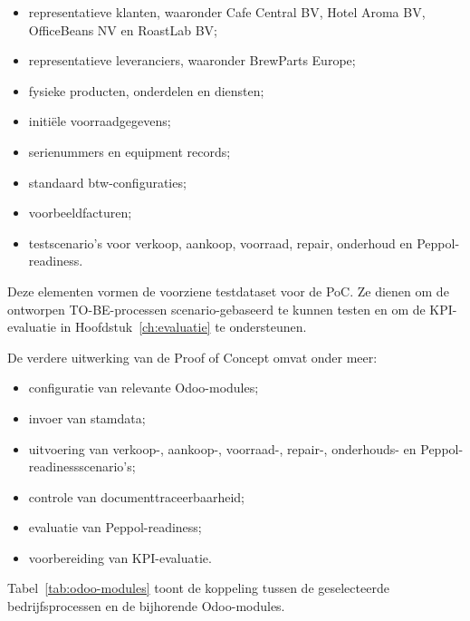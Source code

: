 \begin{itemize}
    \item representatieve klanten, waaronder Cafe Central BV, Hotel Aroma BV, OfficeBeans NV en RoastLab BV;
    \item representatieve leveranciers, waaronder BrewParts Europe;
    \item fysieke producten, onderdelen en diensten;
    \item initiële voorraadgegevens;
    \item serienummers en equipment records;
    \item standaard btw-configuraties;
    \item voorbeeldfacturen;
    \item testscenario’s voor verkoop, aankoop, voorraad, repair, onderhoud en Peppol-readiness.
\end{itemize}

Deze elementen vormen de voorziene testdataset voor de PoC. Ze dienen om de ontworpen TO-BE-processen scenario-gebaseerd te kunnen testen en om de KPI-evaluatie in Hoofdstuk~\ref{ch:evaluatie} te ondersteunen.

De verdere uitwerking van de Proof of Concept omvat onder meer:

\begin{itemize}
    \item configuratie van relevante Odoo-modules;
    \item invoer van stamdata;
    \item uitvoering van verkoop-, aankoop-, voorraad-, repair-, onderhouds- en Peppol-readinessscenario’s;
    \item controle van documenttraceerbaarheid;
    \item evaluatie van Peppol-readiness;
    \item voorbereiding van KPI-evaluatie.
\end{itemize}

Tabel~\ref{tab:odoo-modules} toont de koppeling tussen de geselecteerde bedrijfsprocessen en de bijhorende Odoo-modules.

